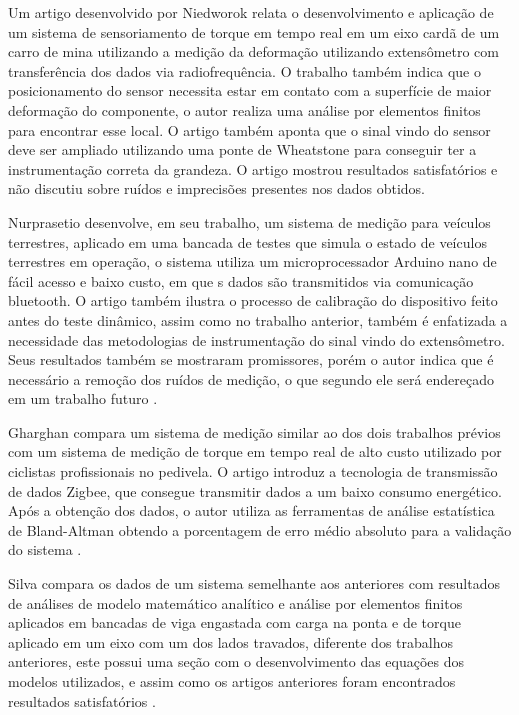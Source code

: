 Um artigo desenvolvido por Niedworok relata o desenvolvimento e aplicação de um sistema de sensoriamento de torque em tempo real em um eixo cardã de um carro de mina
utilizando a medição da deformação utilizando extensômetro com transferência dos dados via radiofrequência.
O trabalho também indica que o posicionamento do sensor necessita estar em contato com a superfície de maior deformação do componente, o autor realiza uma análise por elementos finitos
para encontrar esse local.
O artigo também aponta que o sinal vindo do sensor deve ser ampliado utilizando uma ponte de Wheatstone para conseguir ter a instrumentação correta da grandeza.
O artigo mostrou resultados satisfatórios e não discutiu sobre ruídos e imprecisões presentes nos dados obtidos. \autocite{Niedworok2014}

Nurprasetio desenvolve, em seu trabalho, um sistema de medição para veículos terrestres, aplicado em uma bancada de testes que simula o estado de veículos terrestres em operação, o sistema
utiliza um microprocessador Arduino nano de fácil acesso e baixo custo, em que s dados são transmitidos via comunicação bluetooth.
O artigo também ilustra o processo de calibração do dispositivo feito antes do teste dinâmico, assim como no trabalho anterior, também é enfatizada a necessidade das metodologias de instrumentação
do sinal vindo do extensômetro.
Seus resultados também se mostraram promissores, porém o autor indica que é necessário a remoção dos ruídos de medição, o que segundo ele será endereçado em um trabalho futuro \autocite{Nurprasetio2018}.

Gharghan compara um sistema de medição similar ao dos dois trabalhos prévios com um sistema de medição de torque em tempo real de alto custo utilizado por ciclistas profissionais no pedivela.
O artigo introduz a tecnologia de transmissão de dados Zigbee, que consegue transmitir dados a um baixo consumo energético.
Após a obtenção dos dados, o autor utiliza as ferramentas de análise estatística de Bland-Altman obtendo a porcentagem de erro médio absoluto para a validação do sistema \autocite{Gharghan2017}.

Silva compara os dados de um sistema semelhante aos anteriores com resultados de análises de modelo matemático analítico e análise por elementos finitos aplicados em bancadas de viga engastada com carga
na ponta e de torque aplicado em um eixo com um dos lados travados, diferente dos trabalhos anteriores, este possui uma seção com o desenvolvimento das equações dos modelos utilizados, e assim como os artigos
anteriores foram encontrados resultados satisfatórios \autocite{Silva2017}.

